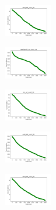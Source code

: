 \begin{figure}[H]
    \begin{subfigure}
        \centering
        \includegraphics[width=0.234\textwidth]{img/ageun/rand_set_const_10_277451237_cost.png}
    \end{subfigure}
    \hfill
    \begin{subfigure}
        \centering
        \includegraphics[width=0.234\textwidth]{img/ageun/newthyroid_set_const_10_277451237_cost.png}
    \end{subfigure}
    \hfill
    \begin{subfigure}
        \centering
        \includegraphics[width=0.234\textwidth]{img/ageun/iris_set_const_10_49258669_cost.png}
    \end{subfigure}
    \hfill
    \begin{subfigure}
        \centering
        \includegraphics[width=0.234\textwidth]{img/ageun/ecoli_set_const_10_49258669_cost.png}
    \end{subfigure}
    \hfill
    \begin{subfigure}
        \centering
        \includegraphics[width=0.234\textwidth]{img/ageun/rand_set_const_10_49258669_cost.png}
    \end{subfigure}
    \hfill
    \begin{subfigure}
        \centering

\end{subfigure}
\end{figure}

